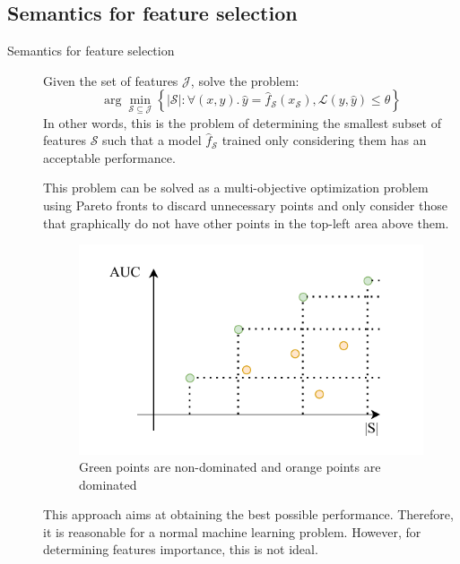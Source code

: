 \subsection{Semantics for feature selection}

\begin{description}
    \item[Semantics for feature selection] 
        Given the set of features $\mathcal{J}$, solve the problem:
        \[ \arg\min_{\mathcal{S} \subseteq \mathcal{J}} \left\{ |\mathcal{S}|: \forall (x, y).\, \hat{y} = \hat{f}_\mathcal{S}(x_\mathcal{S}), \mathcal{L}(y, \hat{y}) \leq \theta \right\} \]
        In other words, this is the problem of determining the smallest subset of features $\mathcal{S}$ such that a model $\hat{f}_\mathcal{S}$ trained only considering them has an acceptable performance.

        \begin{remark}
            This problem can be solved as a multi-objective optimization problem using Pareto fronts to discard unnecessary points and only consider those that graphically do not have other points in the top-left area above them.

            \begin{figure}[H]
                \centering
                \includegraphics[width=0.5\linewidth]{./img/_pareto_front.pdf}
                \caption{Green points are non-dominated and orange points are dominated}
            \end{figure}
        \end{remark}

        \begin{remark}
            This approach aims at obtaining the best possible performance. Therefore, it is reasonable for a normal machine learning problem. However, for determining features importance, this is not ideal.
        \end{remark}
\end{description}